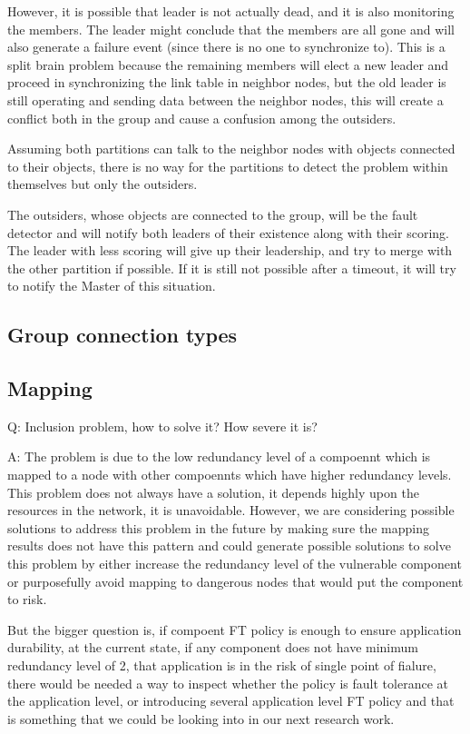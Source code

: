 However, it is possible that leader is not actually dead, and it is also monitoring the members. The leader might conclude that the members are all gone and will also generate a failure event (since there is no one to synchronize to). This is a split brain problem because the remaining members will elect a new leader and proceed in synchronizing the link table in neighbor nodes, but the old leader is still operating and sending data between the neighbor nodes, this will create a conflict both in the group and cause a confusion among the outsiders.

Assuming both partitions can talk to the neighbor nodes with objects connected to their objects, there is no way for the partitions to detect the problem within themselves but only the outsiders.

The outsiders, whose objects are connected to the group, will be the fault detector and will notify both leaders of their existence along with their scoring. The leader with less scoring will give up their leadership, and try to merge with the other partition if possible. If it is still not possible after a timeout, it will try to notify the Master of this situation.

\subsection{Group connection types}

\subsection{Mapping}

Q: Inclusion problem, how to solve it? How severe it is?

A: The problem is due to the low redundancy level of a compoennt which is
mapped to a node with other compoennts which have higher redundancy levels.
This problem does not always have a solution, it depends highly upon the
resources in the network, it is unavoidable. However, we are considering
possible solutions to address this problem in the future by making sure the
mapping results does not have this pattern and could generate possible
solutions to solve this problem by either increase the redundancy level of the
vulnerable component or purposefully avoid mapping to dangerous nodes that
would put the component to risk.

But the bigger question is, if compoent FT policy is enough to ensure
application durability, at the current state, if any component does not have
minimum redundancy level of 2, that application is in the risk of single point
of fialure, there would be needed a way to inspect whether the policy is fault
tolerance at the application level, or introducing several application level FT
policy and that is something that we could be looking into in our next
research work.

